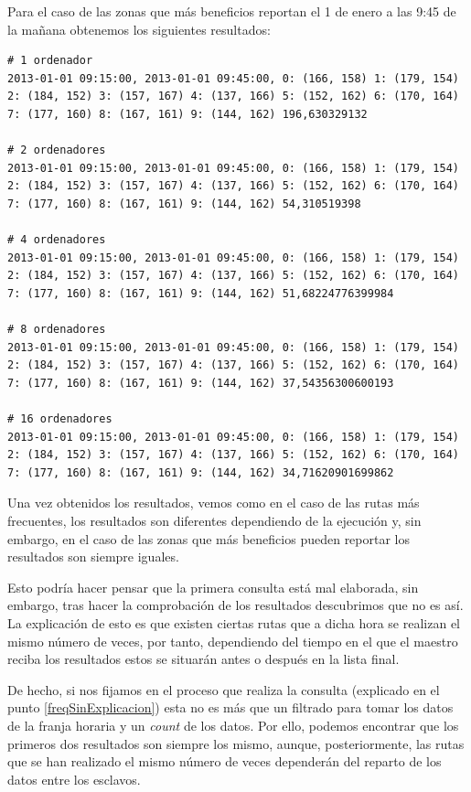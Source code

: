 Para el caso de las zonas que más beneficios reportan el 1 de enero a las 9:45 de la mañana obtenemos los siguientes resultados:

\begin{verbatim}
# 1 ordenador
2013-01-01 09:15:00, 2013-01-01 09:45:00, 0: (166, 158) 1: (179, 154) 
2: (184, 152) 3: (157, 167) 4: (137, 166) 5: (152, 162) 6: (170, 164) 
7: (177, 160) 8: (167, 161) 9: (144, 162) 196,630329132

# 2 ordenadores
2013-01-01 09:15:00, 2013-01-01 09:45:00, 0: (166, 158) 1: (179, 154) 
2: (184, 152) 3: (157, 167) 4: (137, 166) 5: (152, 162) 6: (170, 164) 
7: (177, 160) 8: (167, 161) 9: (144, 162) 54,310519398

# 4 ordenadores
2013-01-01 09:15:00, 2013-01-01 09:45:00, 0: (166, 158) 1: (179, 154) 
2: (184, 152) 3: (157, 167) 4: (137, 166) 5: (152, 162) 6: (170, 164) 
7: (177, 160) 8: (167, 161) 9: (144, 162) 51,68224776399984

# 8 ordenadores
2013-01-01 09:15:00, 2013-01-01 09:45:00, 0: (166, 158) 1: (179, 154) 
2: (184, 152) 3: (157, 167) 4: (137, 166) 5: (152, 162) 6: (170, 164) 
7: (177, 160) 8: (167, 161) 9: (144, 162) 37,54356300600193

# 16 ordenadores
2013-01-01 09:15:00, 2013-01-01 09:45:00, 0: (166, 158) 1: (179, 154) 
2: (184, 152) 3: (157, 167) 4: (137, 166) 5: (152, 162) 6: (170, 164) 
7: (177, 160) 8: (167, 161) 9: (144, 162) 34,71620901699862
\end{verbatim}

Una vez obtenidos los resultados, vemos como en el caso de las rutas más frecuentes, los resultados son diferentes dependiendo de la ejecución y, sin embargo, en el caso de las zonas que más beneficios pueden reportar los resultados son siempre iguales.

Esto podría hacer pensar que la primera consulta está mal elaborada, sin embargo, tras hacer la comprobación de los resultados descubrimos que no es así. La explicación de esto es que existen ciertas rutas que a dicha hora se realizan el mismo número de veces, por tanto, dependiendo del tiempo en el que el maestro reciba los resultados estos se situarán antes o después en la lista final.

De hecho, si nos fijamos en el proceso que realiza la consulta (explicado en el punto \ref{freqSinExplicacion}) esta no es más que un filtrado para tomar los datos de la franja horaria y un \textit{count} de los datos. Por ello, podemos encontrar que los primeros dos resultados son siempre los mismo, aunque, posteriormente, las rutas que se han realizado el mismo número de veces dependerán del reparto de los datos entre los esclavos.

